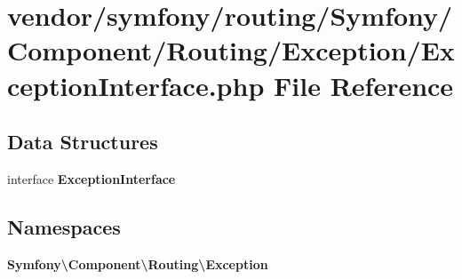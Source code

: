 \section{vendor/symfony/routing/\+Symfony/\+Component/\+Routing/\+Exception/\+Exception\+Interface.php File Reference}
\label{symfony_2routing_2_symfony_2_component_2_routing_2_exception_2_exception_interface_8php}
\subsection*{Data Structures}
\begin{DoxyCompactItemize}
\item 
interface {\bf Exception\+Interface}
\end{DoxyCompactItemize}
\subsection*{Namespaces}
\begin{DoxyCompactItemize}
\item 
 {\bf Symfony\textbackslash{}\+Component\textbackslash{}\+Routing\textbackslash{}\+Exception}
\end{DoxyCompactItemize}
